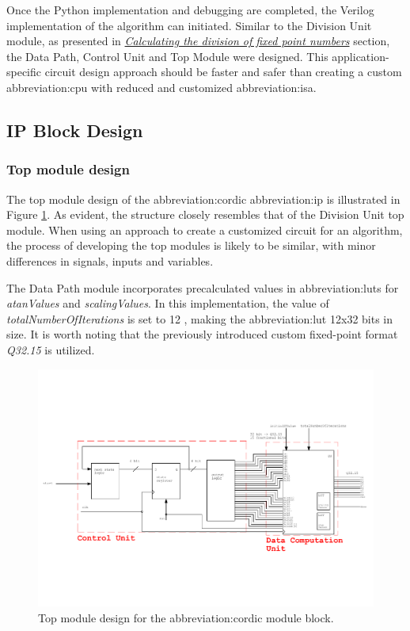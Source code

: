 \documentclass[a4paper, twoside, 11pt]{article}
\newcommand{\fbar}{\FloatBarrier}
\begin{document}
\par
Once the Python implementation and debugging are completed, the Verilog implementation of the algorithm can initiated. Similar to the Division Unit module, as presented in \hyperref[sec:calculating-the-division-of-fixed-point-numbers]{\textit{Calculating the division of fixed point numbers}} section, the Data Path, Control Unit and Top Module were designed. This application-specific circuit design approach should be faster and safer than creating a custom \gls{abbreviation:cpu} with reduced and customized \gls{abbreviation:isa}.

    \fbar
    \subsection{IP Block Design}
    \fbar
        \subsubsection{Top module design}
            The top module design of the \gls{abbreviation:cordic} \gls{abbreviation:ip} is illustrated in Figure \ref{fig:cordic-top-module}. As evident, the structure closely resembles that of the Division Unit top module. When using an approach to create a customized circuit for an algorithm, the process of developing the top modules is likely to be similar, with minor differences in signals, inputs and variables.\par
            The Data Path module incorporates precalculated values in \gls{abbreviation:lut}s for \textit{atanValues} and \textit{scalingValues}. In this implementation, the value of \textit{totalNumberOfIterations} is set to 12 , making the \gls{abbreviation:lut} 12x32 bits in size. It is worth noting that the previously introduced custom fixed-point format \textit{Q32.15} is utilized.
            \begin{figure}[htbp!]
                \centering
                \includegraphics[width=1\textwidth]{src/pdf/cordic-top-module.pdf}
                \caption{Top module design for the \gls{abbreviation:cordic} module block.}
                \label{fig:cordic-top-module}
            \end{figure}
        \fbar
\end{document}
